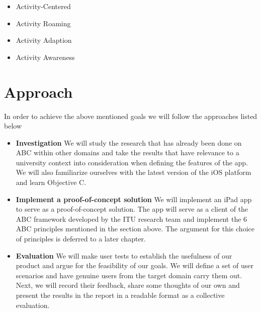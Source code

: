 \begin{itemize}
  \item Activity-Centered
  \item Activity Roaming
  \item Activity Adaption
  \item Activity Awareness
\end{itemize}

\section{Approach}
In order to achieve the above mentioned goals we will follow the approaches listed below

\begin{itemize}
  \item \textbf{Investigation} \newline
        We will study the research that has already been done on ABC within other domains and take the results that have relevance to a university context into consideration when defining the features of the app. We will also familiarize ourselves with the latest version of the iOS platform and learn Objective C.
  \item \textbf{Implement a proof-of-concept solution} \newline
        We will implement an iPad app to serve as a proof-of-concept solution. The app will serve as a client of the ABC framework developed by the ITU research team and implement the 6 ABC principles mentioned in the section above. The argument for this choice of principles is deferred to a later chapter.
  \item \textbf{Evaluation} \newline
        We will make user tests to establish the usefulness of our product and argue for the feasibility of our goals. We will define a set of user scenarios and have genuine users from the target domain carry them out. Next, we will record their feedback, share some thoughts of our own and present the results in the report in a readable format as a collective evaluation.
\end{itemize}

\newpage

